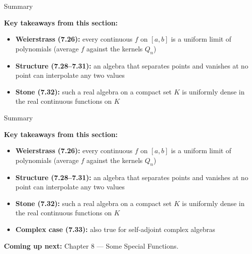 \documentclass[aspectratio=169,12pt,t]{beamer}
\begin{document}
{%
\begin{frame}{Summary}
  \begin{hlbox}
  \textbf{Key takeaways from this section:}
  \begin{itemize}\setlength{\itemsep}{0.35em}
    \item \textbf{Weierstrass (7.26):} every continuous $f$ on $[a,b]$ is a uniform limit of
      polynomials (average $f$ against the kernels $Q_n$)
    \item \textbf{Structure (7.28--7.31):} an \alert{algebra} that \alert{separates points} and
      \alert{vanishes at no point} can interpolate any two values
    \item \textbf{Stone (7.32):} such a real algebra on a compact set $K$ is uniformly dense in
      the real continuous functions on $K$
  \end{itemize}

  \end{hlbox}

\end{frame}

\begin{frame}{Summary}
  \begin{hlbox}
  \textbf{Key takeaways from this section:}
  \begin{itemize}\setlength{\itemsep}{0.35em}
    \item \textbf{Weierstrass (7.26):} every continuous $f$ on $[a,b]$ is a uniform limit of
      polynomials (average $f$ against the kernels $Q_n$)
    \item \textbf{Structure (7.28--7.31):} an \alert{algebra} that \alert{separates points} and
      \alert{vanishes at no point} can interpolate any two values
    \item \textbf{Stone (7.32):} such a real algebra on a compact set $K$ is uniformly dense in
      the real continuous functions on $K$
    \item \textbf{Complex case (7.33):} also true for \alert{self-adjoint} complex algebras
  \end{itemize}
  \vspace{0.3em}
  \textbf{Coming up next:} Chapter 8 --- Some Special Functions.
  \end{hlbox}


\end{frame}}
\end{document}
